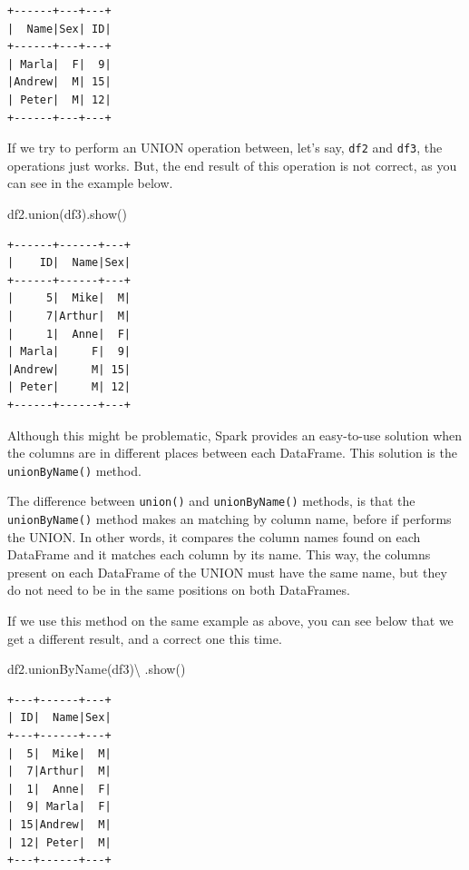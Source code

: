 \documentclass[
  11pt,
  letterpaper,
  DIV=11,
  numbers=noendperiod]{scrreprt}
\newenvironment{Shaded}{\begin{snugshade}}{\end{snugshade}}
\newcommand{\NormalTok}[1]{\textcolor[rgb]{0.00,0.23,0.31}{#1}}
\newcommand{\OperatorTok}[1]{\textcolor[rgb]{0.37,0.37,0.37}{#1}}
\begin{document}
\begin{verbatim}
+------+---+---+
|  Name|Sex| ID|
+------+---+---+
| Marla|  F|  9|
|Andrew|  M| 15|
| Peter|  M| 12|
+------+---+---+
\end{verbatim}

If we try to perform an UNION operation between, let's say, \texttt{df2}
and \texttt{df3}, the operations just works. But, the end result of this
operation is not correct, as you can see in the example below.

\begin{Shaded}
\begin{Highlighting}[]
\NormalTok{df2.union(df3).show()}
\end{Highlighting}
\end{Shaded}

\begin{verbatim}
+------+------+---+
|    ID|  Name|Sex|
+------+------+---+
|     5|  Mike|  M|
|     7|Arthur|  M|
|     1|  Anne|  F|
| Marla|     F|  9|
|Andrew|     M| 15|
| Peter|     M| 12|
+------+------+---+
\end{verbatim}

Although this might be problematic, Spark provides an easy-to-use
solution when the columns are in different places between each
DataFrame. This solution is the \texttt{unionByName()} method.

The difference between \texttt{union()} and \texttt{unionByName()}
methods, is that the \texttt{unionByName()} method makes an matching by
column name, before if performs the UNION. In other words, it compares
the column names found on each DataFrame and it matches each column by
its name. This way, the columns present on each DataFrame of the UNION
must have the same name, but they do not need to be in the same
positions on both DataFrames.

If we use this method on the same example as above, you can see below
that we get a different result, and a correct one this time.

\begin{Shaded}
\begin{Highlighting}[]
\NormalTok{df2.unionByName(df3)}\OperatorTok{\textbackslash{}}
\NormalTok{    .show()}
\end{Highlighting}
\end{Shaded}

\begin{verbatim}
+---+------+---+
| ID|  Name|Sex|
+---+------+---+
|  5|  Mike|  M|
|  7|Arthur|  M|
|  1|  Anne|  F|
|  9| Marla|  F|
| 15|Andrew|  M|
| 12| Peter|  M|
+---+------+---+
\end{verbatim}
\end{document}
